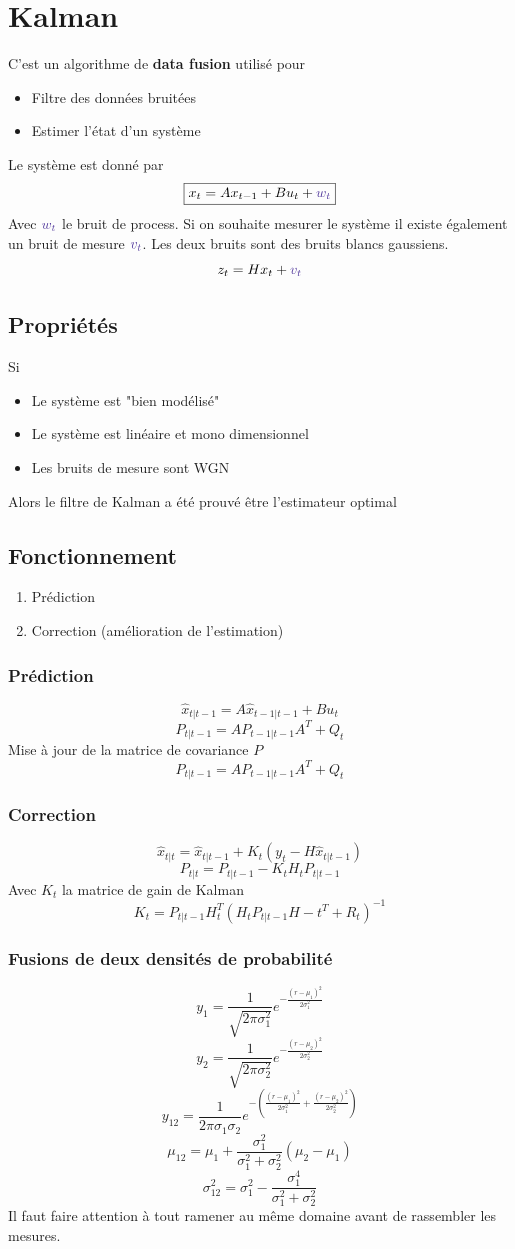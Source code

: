 \documentclass[resume]{subfiles}
\begin{document}
\section{Kalman}
C'est un algorithme de \textbf{data fusion} utilisé pour
\begin{itemize}
\item Filtre des données bruitées
\item Estimer l'état d'un système
\end{itemize}
Le système est donné par
$$\boxed{x_t=Ax_{t-1}+Bu_{t}+\textcolor{Violet}{w_t}}$$
Avec $\textcolor{Violet}{w_t}$ le bruit de process. Si on souhaite mesurer le système il existe également un bruit de mesure $\textcolor{Violet}{v_t}$. Les deux bruits sont des bruits blancs gaussiens.
$$z_t=Hx_t+\textcolor{Violet}{v_t}$$
\subsection{Propriétés}
Si
\begin{itemize}
\item Le système est "bien modélisé"
\item Le système est linéaire et mono dimensionnel
\item Les bruits de mesure sont WGN
\end{itemize}
Alors le filtre de Kalman a été prouvé être l'estimateur optimal
\subsection{Fonctionnement}
\begin{enumerate}
\item Prédiction
\item Correction (amélioration de l'estimation)
\end{enumerate}
\subsubsection{Prédiction}
$$\hat{x}_{t|t-1}=A\hat{x}_{t-1|t-1}+Bu_t$$
$$P_{t|t-1}=AP_{t-1|t-1}A^{T}+Q_t$$
Mise à jour de la matrice de covariance $P$
$$P_{t|t-1}=AP_{t-1|t-1}A^T+Q_t$$
\subsubsection{Correction}
$$\hat{x}_{t|t}=\hat{x}_{t|t-1}+K_t(y_t-H\hat{x}_{t|t-1})$$
$$P_{t|t}=P_{t|t-1}-K_tH_tP_{t|t-1}$$
Avec $K_t$ la matrice de gain de Kalman
$$K_t=P_{t|t-1}H_t^T(H_tP_{t|t-1}H-t^T+R_t)^{-1}$$
\subsubsection{Fusions de deux densités de probabilité}
$$y_1=\frac{1}{\sqrt{2\pi \sigma_1^2}}e^{-\frac{(r-\mu_1)^2}{2\sigma_1^2}}$$
$$y_2=\frac{1}{\sqrt{2\pi \sigma_2^2}}e^{-\frac{(r-\mu_2)^2}{2\sigma_2^2}}$$
$$y_{12}=\frac{1}{2\pi\sigma_1\sigma_2}e^{-\left(\frac{(r-\mu_1)^2}{2\sigma_1^2}+\frac{(r-\mu_2)^2}{2\sigma_2^2}\right)}$$
$$\boxed{\mu_{12}=\mu_1+\frac{\sigma_1^2}{\sigma_1^2+\sigma_2^2}\left(\mu_2-\mu_1\right)}$$
$$\boxed{\sigma_{12}^2=\sigma_1^2-\frac{\sigma_1^4}{\sigma_1^2+\sigma_2^2}}$$
Il faut faire attention à tout ramener au même domaine avant de rassembler les mesures.
\end{document}
